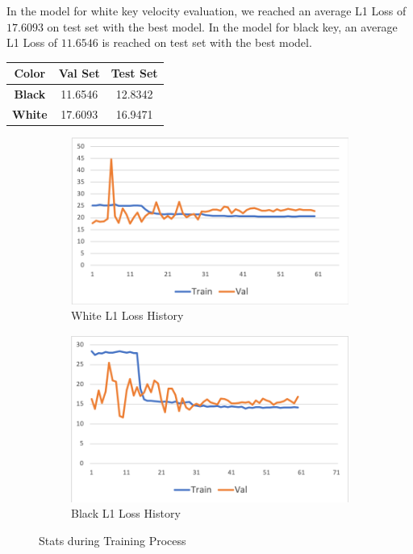 \documentclass[10pt,twocolumn,letterpaper]{article}
\begin{document}
In the model for white key velocity evaluation, we reached an average L1 Loss of \(17.6093\) on test set with the best model. In the model for black key, an average L1 Loss of \(11.6546\) is reached on test set with the best model.\\

\begin{minipage}{\linewidth}
   \centering
\begin{tabular}{ccc}
   \toprule
   Color & Val Set & Test Set\\
   \midrule
   \textbf{Black} & 11.6546 & 12.8342\\
   \textbf{White} & 17.6093 & 16.9471\\
   \bottomrule
   \end{tabular}
    \label{tab:prevdataset}

\end{minipage}

\begin{figure}[h!]
   \begin{subfigure}{0.25\textwidth}
      \centering
      \includegraphics[width=\linewidth]{fig/vel_1.png}
      \caption{White L1 Loss History} \label{fig:k}
    \end{subfigure}\hspace*{\fill}
    \begin{subfigure}{0.25\textwidth}
      \centering
      \includegraphics[width=\linewidth]{fig/vel_3.png}
      \caption{Black L1 Loss History} \label{fig:k}
    \end{subfigure}\hspace*{\fill}
   \caption{Stats during Training Process} \label{fig:6}
\end{figure}   
\end{document}
